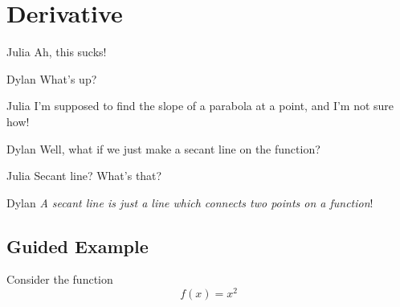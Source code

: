 \documentclass[handout]{ximera}
\begin{document}
\section{Derivative}
\begin{dialogue}
\item[Julia] Ah, this sucks!
\item[Dylan] What's up?
\item[Julia] I'm supposed to find the slope of a parabola at a point, and I'm not sure how!
\item[Dylan] Well, what if we just make a secant line on the function?
\item[Julia] Secant line? What's that?
\item[Dylan] \textit{A secant line is just a line which connects two points on a function}!
\end{dialogue}

\subsection{Guided Example}

Consider the function $$f(x) = x^2$$
\begin{image}
\end{image}
\end{document}
